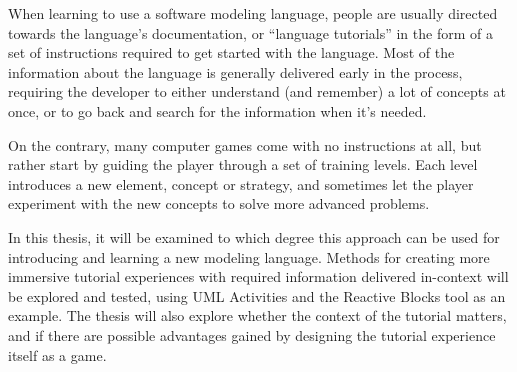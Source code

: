 \noindent
When learning to use a software modeling language, people are usually directed towards the language's documentation, or ``language tutorials'' in the form of a set of instructions required to get started with the language. Most of the information about the language is generally delivered early in the process, requiring the developer to either understand (and remember) a lot of concepts at once, or to go back and search for the information when it's needed.

\noindent
On the contrary, many computer games come with no instructions at all, but rather start by guiding the player through a set of training levels. Each level introduces a new element, concept or strategy, and sometimes let the player experiment with the new concepts to solve more advanced problems.

\noindent
In this thesis, it will be examined to which degree this approach can be used for introducing and learning a new modeling language. Methods for creating more immersive tutorial experiences with required information delivered in-context will be explored and tested, using UML Activities and the Reactive Blocks tool as an example. The thesis will also explore whether the context of the tutorial matters, and if there are possible advantages gained by designing the tutorial experience itself as a game.
